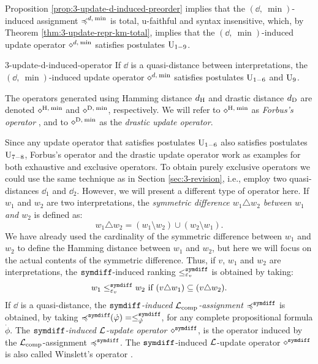 Proposition \ref{prop:3-update-d-induced-preorder} 
implies that the $({\dd,\:\min})$-induced assignment $\preccurlyeq^{d,\:{\operatorname{min}}}$ 
is total, u-faithful and syntax insensitive, 
which, by Theorem \ref{thm:3-update-repr-km-total}, 
implies that the $({\dd,\:\min})$-induced update operator 
$\diamond^{d,\:{\operatorname{min}}}$ satisfies postulates $\mathrm{U}_{1-9}$.

\begin{crl}{}{3-update-d-induced-operator}
	If $\dd$ is a quasi-distance between interpretations, 
	the $(\dd,\:\min)$-induced update operator $\diamond^{d,\:{\operatorname{min}}}$ 
	satisfies postulates $\mathrm{U}_{1-6}$ and $\mathrm{U}_{9}$.
\end{crl}

The operators generated using Hamming distance $d_{{\operatorname{H}}}$
and drastic distance $d_{{\operatorname{D}}}$
are denoted $\diamond^{{\operatorname{H}},\:{\operatorname{min}}}$ and $\diamond^{{\operatorname{D}},\:{\operatorname{min}}}$,
respectively.
We will refer to $\diamond^{{\operatorname{H}},\:{\operatorname{min}}}$ as \emph{Forbus's operator} \cite{Forbus89}, 
and to $\diamond^{{\operatorname{D}},\:{\operatorname{min}}}$ as the \emph{drastic update operator}.

Since any update operator that satisfies postulates $\mathrm{U}_{1-6}$
also satisfies postulates $\mathrm{U}_{7-8}$, Forbus's operator and the drastic 
update operator work as examples for both exhaustive and exclusive operators.
To obtain purely exclusive operators we could use the same technique as in 
Section \ref{sec:3-revision}, i.e., employ two quasi-distances $\dd_1$ and $\dd_2$.
However, we will present a different type of operator here.
If $w_1$ and $w_2$ are two interpretations, 
the \emph{symmetric difference $w_1\triangle w_2$ between $w_1$ and $w_2$} is defined as:
$$
	w_1\triangle w_2 = (w_1\setminus w_2)\cup(w_2\setminus w_1).
$$
We have already used the cardinality of the symmetric difference between $w_1$ and $w_2$
to define the Hamming distance between $w_1$ and $w_2$,
but here we will focus on the actual contents of the symmetric difference.
Thus,
if $v$, $w_1$ and $w_2$ are interpretations, the
$\mathtt{symdiff}$-induced ranking $\le^{\mathtt{symdiff}}_{\varepsilon_{v}}$
is obtained by taking:
$$
	w_1\le^{\mathtt{symdiff}}_{\varepsilon_{v}} w_2~\text{if}~(v\triangle w_1) \subseteq (v\triangle w_2).
$$
If $\dd$ is a quasi-distance,
the \emph{$\mathtt{symdiff}$-induced $\mathcal{L}_{{\operatorname{comp}}}$-assignment $\preccurlyeq^{\mathtt{symdiff}}$} is obtained,
by taking 
$\preccurlyeq^{\mathtt{symdiff}}\!\!(\dot{\varphi})=\le_{\dot{\varphi}}^{\mathtt{symdiff}}$,
for any complete propositional formula $\dot{\phi}$.
The \emph{$\mathtt{symdiff}$-induced $\mathcal{L}$-update operator $\diamond^{\mathtt{symdiff}}$},
is the operator induced by the $\mathcal{L}_{{\operatorname{comp}}}$-assignment $\preccurlyeq^{\mathtt{symdiff}}$.
The $\mathtt{symdiff}$-induced $\mathcal{L}$-update operator $\diamond^{\mathtt{symdiff}}$
is also called Winslett's operator \cite{Winslett05}.

